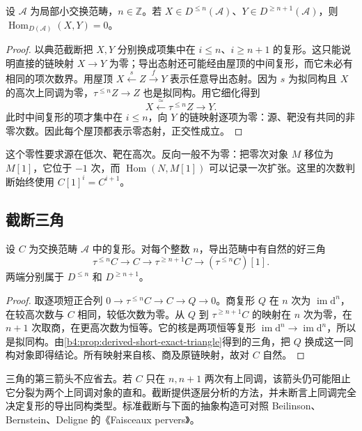 \begin{proposition}\label{b4:prop:standard-truncation-orthogonality}
	设 \(\mathcal A\) 为局部小交换范畴，\(n\in\mathbb Z\)。若 \(X\in D^{\le n}(\mathcal A)\)、\(Y\in D^{\ge n+1}(\mathcal A)\)，则 \(\operatorname{Hom}_{D(\mathcal A)}(X,Y)=0\)。
\end{proposition}
\begin{proof}
	以典范截断把 \(X,Y\) 分别换成项集中在 \(i\le n\)、\(i\ge n+1\) 的复形。这只能说明直接的链映射 \(X\to Y\) 为零；导出态射还可能经由屋顶的中间复形，而它未必有相同的项次数界。用屋顶 \(X\xleftarrow{s}Z\xrightarrow{f}Y\) 表示任意导出态射。因为 \(s\) 为拟同构且 \(X\) 的高次上同调为零，\(\tau^{\le n}Z\to Z\) 也是拟同构。用它细化得到
	\[
		X\xleftarrow{\ \simeq\ }\tau^{\le n}Z\longrightarrow Y.
	\]
	此时中间复形的项才集中在 \(i\le n\)，向 \(Y\) 的链映射逐项为零：源、靶没有共同的非零次数。因此每个屋顶都表示零态射，正交性成立。
\end{proof}

这个零性要求源在低次、靶在高次。反向一般不为零：把零次对象 \(M\) 移位为 \(M[1]\)，它位于 \(-1\) 次，而 \(\operatorname{Hom}(N,M[1])\) 可以记录一次扩张。这里的次数判断始终使用 \(C[1]^i=C^{i+1}\)。

\subsection{截断三角}
\label{b4:subsec:1901:03}

\begin{proposition}\label{b4:prop:standard-truncation-triangle}
	设 \(C\) 为交换范畴 \(\mathcal A\) 中的复形。对每个整数 \(n\)，导出范畴中有自然的好三角
	\[
		\tau^{\le n}C\longrightarrow C\longrightarrow \tau^{\ge n+1}C\longrightarrow(\tau^{\le n}C)[1].
	\]
	两端分别属于 \(D^{\le n}\) 和 \(D^{\ge n+1}\)。
\end{proposition}
\begin{proof}
	取逐项短正合列 \(0\to\tau^{\le n}C\to C\to Q\to0\)。商复形 \(Q\) 在 \(n\) 次为 \(\operatorname{im}\mathrm{d}^n\)，在较高次数与 \(C\) 相同，较低次数为零。从 \(Q\) 到 \(\tau^{\ge n+1}C\) 的映射在 \(n\) 次为零，在 \(n+1\) 次取商，在更高次数为恒等。它的核是两项恒等复形 \(\operatorname{im}\mathrm{d}^n\to\operatorname{im}\mathrm{d}^n\)，所以是拟同构。由\cref{b4:prop:derived-short-exact-triangle}得到的三角，把 \(Q\) 换成这一同构对象即得结论。所有映射来自核、商及原链映射，故对 \(C\) 自然。
\end{proof}

三角的第三箭头不应省去。若 \(C\) 只在 \(n,n+1\) 两次有上同调，该箭头仍可能阻止它分裂为两个上同调对象的直和。截断提供逐层分析的方法，并未断言上同调完全决定复形的导出同构类型。标准截断与下面的抽象构造可对照 Beilinson、Bernstein、Deligne 的《Faisceaux pervers》\cite[Exemples 1.3.2; Proposition 1.3.3]{BBD1982FaisceauxPervers}。
